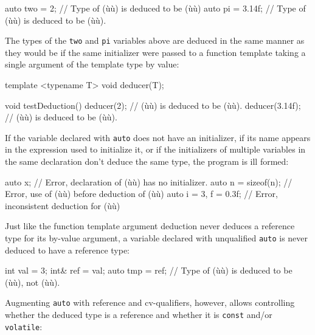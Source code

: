 \begin{emcppslisting}
auto two = 2;     // Type of (ù{}ù) is deduced to be (ù{}ù)
auto pi = 3.14f;  // Type of (ù{}ù) is deduced to be (ù{}ù).
\end{emcppslisting}

\noindent The types of the \lstinline!two! and \lstinline!pi! variables above are
deduced in the same manner as they would be if the same initializer were
passed to a function template taking a single argument of the template
type by value:

\begin{emcppslisting}
template <typename T> void deducer(T);

void testDeduction()
{
    deducer(2);      // (ù{}ù) is deduced to be (ù{}ù).
    deducer(3.14f);  // (ù{}ù) is deduced to be (ù{}ù).
}
\end{emcppslisting}

\noindent If the variable declared with \lstinline!auto! does not have an
initializer, if its name appears in the expression used to initialize
it, or if the initializers of multiple variables in the same declaration
don't deduce the same type, the program is ill formed:

\begin{emcppslisting}
auto x;                // Error, declaration of (ù{}ù) has no initializer.
auto n = sizeof(n);    // Error, use of (ù{}ù) before deduction of (ù{}ù)
auto i = 3, f = 0.3f;  // Error, inconsistent deduction for (ù{}ù)
\end{emcppslisting}

\noindent Just like the function template argument deduction never deduces a
reference type for its by-value argument, a variable declared with
unqualified \lstinline!auto! is never deduced to have a reference type:

\begin{emcppslisting}
int  val = 3;
int& ref = val;
auto tmp = ref;  // Type of (ù{}ù) is deduced to be (ù{}ù), not (ù{}ù).
\end{emcppslisting}

\noindent Augmenting \lstinline!auto! with reference and cv-qualifiers, however,
allows controlling whether the deduced type is a reference and whether
it is \lstinline!const! and/or \lstinline!volatile!:


